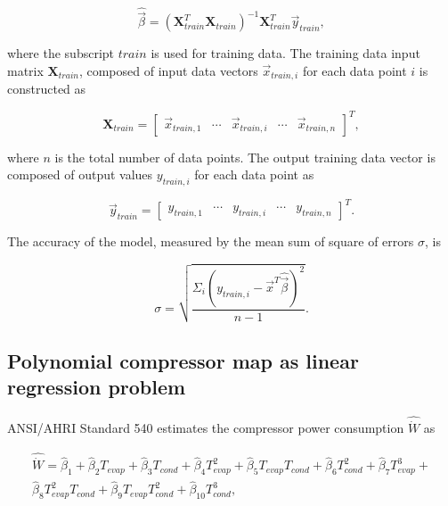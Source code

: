 \begin{equation}
\hat {\vec \beta}  = {({\mathbf{X}}_{train}^T{{\mathbf{X}}_{train}})^{ - 1}}{\mathbf{X}}_{train}^T{\vec y_{train}},
\label{eq:estimte_parameters}
\end{equation}

where the subscript $train$ is used for training data. The training data input matrix ${{\mathbf{X}}_{train}}$, composed of input data vectors ${\vec x}_{train,i}$ for each data point $i$ is constructed as

\begin{equation}
 {{\mathbf{X}}_{train}} = {\left[ {\begin{array}{*{20}{c}} {{{\vec x}_{train,1}}}& \cdots &{{{\vec x}_{train,i}}}& \cdots &{{{\vec x}_{train,n}}}
\end{array}} \right]^T},
\label{eq:input_tr_matrix}
\end{equation}

where $n$ is the total number of data points. The output training data vector is composed of output values $y_{train,i}$ for each data point as

\begin{equation}
{\vec y_{train}} = {\left[ {\begin{array}{*{20}{c}}
  {{y_{train,1}}}& \cdots &{{y_{train,i}}}& \cdots &{{y_{train,n}}} 
\end{array}} \right]^T}.
\label{eq:output_tr_vector}
\end{equation}

The accuracy of the model, measured by the mean sum of square of errors $\sigma$, is 

\begin{equation}
\sigma  = \sqrt {\frac {{\Sigma _i}{{({y_{train,i}} - {{\vec x}^T}\hat {\vec \beta} )}^2}} {n - 1}}.
\label{eq:acc_est_model}
\end{equation}

\subsection{Polynomial compressor map as linear regression problem}
\label{sec:linreg_compmap}
ANSI/AHRI Standard 540 \cite{AHRI:540} estimates the compressor power consumption $\hat {\dot W}$ as

\begin{equation}
\begin{gathered}
  \hat {\dot W} = {\hat{\beta} _1} + {\hat{\beta} _2}{T_{evap}} + {\hat{\beta} _3}{T_{cond}} + {\hat{\beta} _4}T_{evap}^2 + {\hat{\beta} _5}{T_{evap}}{T_{cond}} + {\hat{\beta} _6}T_{cond}^2 + {\hat{\beta} _7}T_{evap}^3 + \\
  {\hat{\beta} _8}T_{evap}^2{T_{cond}} + {\hat{\beta} _9}{T_{evap}}T_{cond}^2   + {\hat{\beta} _{10}}T_{cond}^3 ,
\end{gathered} 
\label{eq:pwr_map_definition}
\end{equation}


